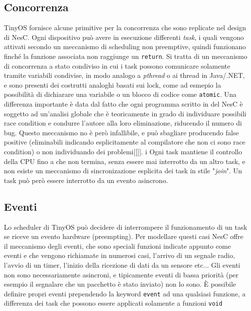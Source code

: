 \documentclass[pdftex,11pt,a4paper,italian,openany]{book}
\begin{document}
\subsection{Concorrenza}
TinyOS fornisce alcune primitive per la concorrenza che sono replicate nel design di NesC.
Ogni dispositivo può avere in esecuzione differenti \emph{task}, i quali vengono attivati 
secondo un 
meccanismo di scheduling non preemptive, quindi funzionano finché la funzione associata non 
raggiunge un \texttt{return}. Si tratta di un meccanismo di concorrenza a stato condiviso in cui 
i task possono comunicare solamente tramite variabili condivise, in modo analogo a 
\emph{pthread} o ai thread in Java/.NET, e sono presenti dei costrutti analoghi basati sui lock, come ad esmepio la possibilità di dichiarare una variabile o un blocco di codice come \texttt{atomic}.
Una differenza importante è data dal fatto che ogni programma scritto in del NesC è soggetto ad 
un'analisi globale che è teoricamente in grado di individuare possibili race condition e 
condurre l'autore alla loro eliminazione, riducendo il numero di bug. 
Questo meccanismo no è però infallibile, e può sbagliare producendo false positive 
(eliminabili indicando esplicitamente al compilatore che non ci sono race condition) o non 
individuando dei problemi[[]]. i
Ogni task mantiene il controllo della CPU fino a che non termina, senza essere mai interrotto da un altro task, e non esiste un meccanismo di sincronizazione esplicita 
dei task in stile "\emph{join}".
Un task può però essere interrotto da un evento asincrono.


\subsection{Eventi}
Lo scheduler di TinyOS può decidere di interrompere il funzionamento di un task se riceve un 
evento hardware (preempting). Per modellare questi casi NesC offre il meccanismo degli eventi, 
che sono speciali funzioni indicate appunto come eventi e che vengono richiamate in numerosi casi, l'arrivo di un segnale radio, l'avvio di un timer, l'inizio della ricezione di dati da un sensore etc...
Gli eventi non sono necessariamente asincroni, e tipicamente eventi di bassa priorità (per esempio il segnalare che un pacchetto è stato inviato) non lo sono.
\`E possibile definire propri eventi prependendo la keyword \texttt{event} ad una qualsiasi 
funzione, a differenza dei task che possono essere applicati solamente a funzioni \texttt{void}

 
\end{document}
